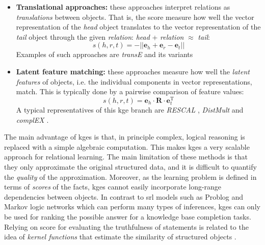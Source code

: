 \begin{itemize}
	\item \textbf{Translational approaches:} these approaches interpret relations as \textit{translations} between objects. That is, the score measure how well the vector representation of the \textit{head} object translates to the vector representation of the \textit{tail} object through the given \textit{relation}: \textit{head} + \textit{relation} $\approx$ \textit{tail}:
		\begin{equation}
			s(h,r,t) = - || \mathbf{e}_{h} + \mathbf{e}_{r} - \mathbf{e}_{t} ||
		\end{equation}
		Examples of such approaches are \textit{transE} \cite{Bordes:2013:TEM} and its variants \cite{Lin:2015:LER:2886521.2886624,nguyen-EtAl:2016:N16-1,Arbelaitz:2013,P15-1067}

	\item \textbf{Latent feature matching:} these approaches measure how well the \textit{latent features} of objects, i.e. the individual components in vector representations, match. This is typically done by a pairwise comparison of feature values:
	 	\begin{equation}
	 		s(h,r,t) = \mathbf{e}_{h} \cdot \mathbf{R} \cdot \mathbf{e}_{t}^{\text{T}}
	 	\end{equation}
	 	A typical representatives of this \gls{kge} branch are \textit{RESCAL} \cite{Nickel2011}, \textit{DistMult} \cite{YangYHGD14a} and \textit{complEX} \cite{trouillon2016complex}.
\end{itemize}


The main advantage of \gls{kge}s is that, in principle complex, logical reasoning is replaced with a simple algebraic computation.
This makes \gls{kge}s a very scalable approach for relational learning.
The main limitation of these methods is that they only approximate the original structured data, and it is difficult to quantify the \textit{quality} of the approximation.
Moreover, as the learning problem is defined in terms of \textit{scores} of the facts, \gls{kge}s cannot easily incorporate  long-range dependencies between objects.
In contrast to \gls{srl} models such as Problog and Markov logic networks which can perform many types of inferences, \gls{kge}s can only be used for ranking the possible answer for a knowledge base completion tasks.
Relying on score for evaluating the truthfulness of statements is related to the idea of \textit{kernel functions} that estimate the similarity of structured objects \cite{Suykens:2017:DRK:3140935.3140940,suykens2010}.




